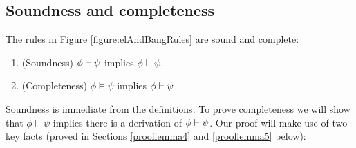 \subsection{Soundness and completeness}

\begin{theorem}\label{theorem:elAndBang:soundComplete}
The rules in Figure \ref{figure:elAndBangRules} are sound and complete:
\begin{enumerate}

\item\label{theorem:elAndBang:sound} (Soundness) $\phi \vdash \psi$ implies $\phi \models \psi$.

\item\label{theorem:elAndBang:complete} (Completeness) $\phi \models \psi$ implies $\phi \vdash \psi$.

\end{enumerate}
\end{theorem}

\NI Soundness is immediate from the definitions. 
 To prove completeness  we will show that $\phi
\models \psi$ implies there is a derivation of $\phi \vdash \psi$.  Our proof
will make use of two key facts (proved in Sections \ref{prooflemma4} and \ref{prooflemma5} below):






